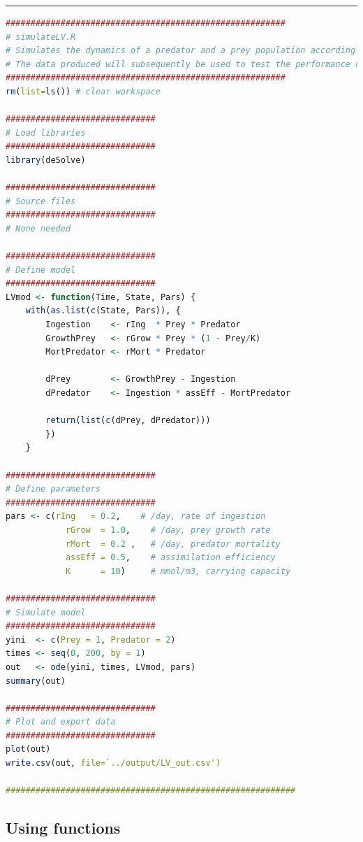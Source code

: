\documentclass[12pt,letterpaper]{article}
\begin{document}
\noindent\rule{12cm}{0.4pt}
\begin{lstlisting}[language=R]
########################################################
# simulateLV.R
# Simulates the dynamics of a predator and a prey population according to the Lotka-Volterra model.
# The data produced will subsequently be used to test the performance of several population dynamic model-fitting routines.
########################################################
rm(list=ls()) # clear workspace

##############################
# Load libraries
##############################
library(deSolve)

##############################
# Source files
##############################
# None needed

##############################
# Define model
##############################
LVmod <- function(Time, State, Pars) {
	with(as.list(c(State, Pars)), {
		Ingestion    <- rIng  * Prey * Predator
		GrowthPrey   <- rGrow * Prey * (1 - Prey/K)
		MortPredator <- rMort * Predator

		dPrey        <- GrowthPrey - Ingestion
		dPredator    <- Ingestion * assEff - MortPredator

		return(list(c(dPrey, dPredator)))
		})
	}

##############################
# Define parameters
##############################
pars <- c(rIng   = 0.2,    # /day, rate of ingestion
	        rGrow  = 1.0,    # /day, prey growth rate
	        rMort  = 0.2 ,   # /day, predator mortality
	        assEff = 0.5,    # assimilation efficiency
	        K      = 10)     # mmol/m3, carrying capacity

##############################
# Simulate model
##############################
yini  <- c(Prey = 1, Predator = 2)
times <- seq(0, 200, by = 1)
out   <- ode(yini, times, LVmod, pars)
summary(out)

##############################
# Plot and export data
##############################
plot(out)
write.csv(out, file=`../output/LV_out.csv')

##########################################################
\end{lstlisting}



\subsection{Using functions}
\end{document}

